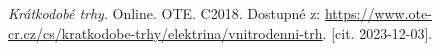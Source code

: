 \begin{thebibliography}{9}
    \textit{Krátkodobé trhy}. Online. OTE. C2018. Dostupné z: \url{https://www.ote-cr.cz/cs/kratkodobe-trhy/elektrina/vnitrodenni-trh}. [cit. 2023-12-03].
\end{thebibliography}